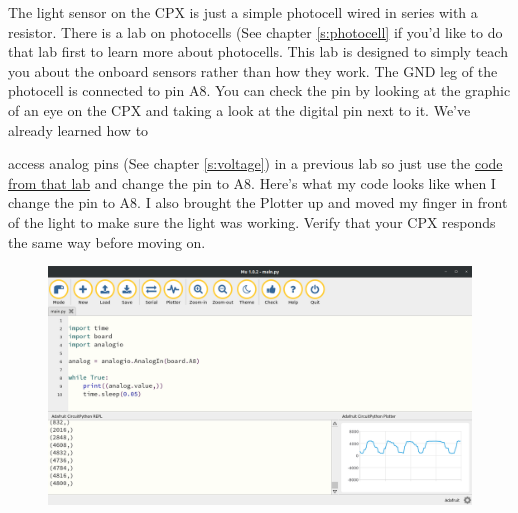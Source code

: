 The light sensor on the CPX is just a simple photocell wired in series
with a resistor. There is a lab on photocells (See
chapter \ref{s:photocell} if you'd like to do that lab first to learn more
about photocells. This lab is designed to simply teach you about the onboard sensors rather than how they work. The GND leg of the photocell is connected to pin
A8. You can check the pin by looking at the graphic of an eye on the
CPX and taking a look at the digital pin next to it. We’ve already
learned how to {access analog pins (See chapter \ref{s:voltage}) in a
previous lab so just use
the \href{https://github.com/cmontalvo251/Microcontrollers/blob/master/Circuit_Playground/CircuitPython/Analog/analog_simple.py}{code
from that lab} and change the pin to A8. Here’s what my code looks
like when I change the pin to A8. I also brought the Plotter up and
moved my finger in front of the light to make sure the light was
working. Verify that your CPX responds the same way before moving on. 
\begin{figure}[H]
  \begin{center}
    \includegraphics[width=\textwidth]{Figures/modules_light_mu.png}
  \end{center}
\end{figure}
}
